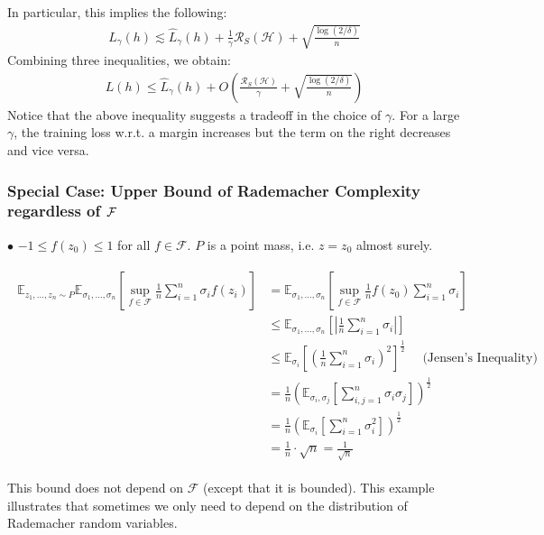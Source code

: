 \documentclass{article}
\begin{document}
\begin{exma}
In particular, this implies the following:
\begin{align*}
L_{\gamma}(h) \lesssim \hat{L}_{\gamma}(h)+\frac{1}{\gamma} \mathcal{R}_{S}(\mathcal{H})+\sqrt{\frac{\log (2 / \delta)}{n}}
\end{align*}
Combining three inequalities, we obtain:
\begin{align*}
L(h) \leq \hat{L}_{\gamma}(h)+O\left(\frac{\mathcal{R}_{S}(\mathcal{H})}{\gamma}+\sqrt{\frac{\log (2 / \delta)}{n}}\right)
\end{align*}
Notice that the above inequality suggests a tradeoff in the choice of $\gamma$. For a large $\gamma$, the training loss w.r.t. a margin increases but the term on the right decreases and vice versa.
\end{exma} 



\subsubsection{Special Case: Upper Bound of Rademacher Complexity regardless of $\mathcal{F}$}\label{eq:nierfa}
$\bullet$  $-1 \leq f\left(z_{0}\right) \leq 1$ for all $f \in \mathcal{F}$. $P$ is a point mass, i.e. $z = z_0$ almost surely.

\begin{align*}
\begin{aligned}
\mathbb{E}_{z_{1}, \ldots, z_{n} \sim P}\mathbb{E}_{\sigma_{1}, \ldots, \sigma_{n}}\left[\sup _{f \in \mathcal{F}} \frac{1}{n} \sum_{i=1}^{n} \sigma_{i} f\left(z_{i}\right)\right] &=\mathbb{E}_{\sigma_{1}, \ldots, \sigma_{n}}\left[\sup _{f \in \mathcal{F}} \frac{1}{n} f\left(z_{0}\right) \sum_{i=1}^{n} \sigma_{i}\right] \\
& \leq \mathbb{E}_{\sigma_{1}, \ldots, \sigma_{n}}\left[\left|\frac{1}{n} \sum_{i=1}^{n} \sigma_{i}\right|\right] \\
& \leq \mathbb{E}_{\sigma_{i}}\left[\left(\frac{1}{n} \sum_{i=1}^{n} \sigma_{i}\right)^{2}\right]^{\frac{1}{2}  } \quad \text{ (Jensen’s Inequality) } \\
&=\frac{1}{n}\left(\mathbb{E}_{\sigma_{i}, \sigma_{j}}\left[\sum_{i, j=1}^{n} \sigma_{i} \sigma_{j}\right]\right)^{\frac{1}{2}} \\
&=\frac{1}{n}\left(\mathbb{E}_{\sigma_{i}}\left[\sum_{i=1}^{n} \sigma_{i}^{2}\right]\right)^{\frac{1}{2}} \\
&=\frac{1}{n} \cdot \sqrt{n}=\frac{1}{\sqrt{n}}
\end{aligned}
\end{align*}
\begin{rema}
This bound does not depend on $\mathcal{F}$ (except that it is bounded). This example illustrates that sometimes we only need to depend on the distribution of Rademacher random variables.
\end{rema}
\end{document}
